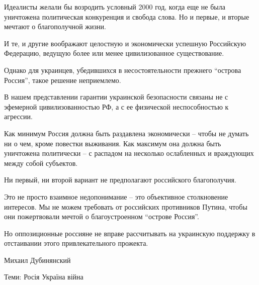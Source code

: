 Идеалисты желали бы возродить условный 2000 год, когда еще не была уничтожена
политическая конкуренция и свобода слова. Но и первые, и вторые мечтают о
благополучной жизни.

И те, и другие воображают целостную и экономически успешную Российскую
Федерацию, ведущую более или менее цивилизованное существование.  

Однако для украинцев, убедившихся в несостоятельности прежнего \enquote{острова
Россия}, такое решение неприемлемо.

\begin{leftbar}
В нашем представлении гарантии украинской безопасности связаны не с эфемерной
цивилизованностью РФ, а с ее физической неспособностью к агрессии. 
\end{leftbar}

Как минимум Россия должна быть раздавлена экономически –  чтобы не думать ни о
чем, кроме повестки выживания. Как максимум она должна быть уничтожена
политически – с распадом на несколько ослабленных и враждующих между собой
субъектов.

Ни первый, ни второй вариант не предполагают российского благополучия.

Это не просто взаимное недопонимание – это объективное столкновение интересов.
Мы не можем требовать от российских противников Путина, чтобы они пожертвовали
мечтой о благоустроенном \enquote{острове Россия}.

Но оппозиционные россияне не вправе рассчитывать на украинскую поддержку в
отстаивании этого привлекательного прожекта.

Михаил Дубинянский

Теми: Росія Україна війна

